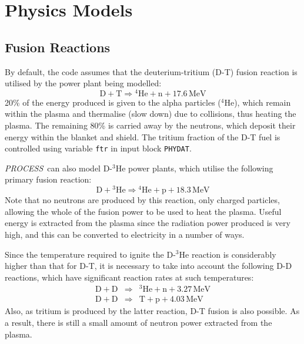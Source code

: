 \documentclass[11pt,a4paper]{report}
\newcommand{\PS}{\mbox{\it PROCESS\/ }}
\begin{document}
\section{Physics Models}

\setlength{\parskip}{0mm}
\subsection{Fusion Reactions}

By default, the code assumes that the deuterium-tritium (D-T) fusion reaction
is utilised by the power plant being modelled:
\begin{equation}
\mathrm{D + T} \Longrightarrow \mathrm{^{4}He + n + 17.6 \,MeV}
\label{eq:d-t}
\end{equation}
20\% of the energy produced is given to the alpha particles ($^4$He), which
remain within the plasma and thermalise (slow down) due to collisions, thus
heating the plasma. The remaining 80\% is carried away by the neutrons, which
deposit their energy within the blanket and shield. The tritium fraction of
the D-T fuel is controlled using variable \texttt{ftr} in input block
\texttt{PHYDAT}.

\setlength{\parskip}{5mm}
\PS can also model D-$^3$He power plants, which utilise the following primary
fusion reaction:
\begin{equation}
\mathrm{D + \mbox{$^3$He}} \Longrightarrow \mathrm{^{4}He + p + 18.3 \,MeV}
\label{eq:dhe3}
\end{equation}
Note that no neutrons are produced by this reaction, only charged particles,
allowing the whole of the fusion power to be used to heat the plasma. Useful
energy is extracted from the plasma since the radiation power produced is very
high, and this can be converted to electricity in a number of ways.

Since the temperature required to ignite the D-$^3$He reaction is considerably
higher than that for D-T, it is necessary to take into account the following
D-D reactions, which have significant reaction rates at such temperatures:
\begin{eqnarray}
\mathrm{D + D} & \Longrightarrow & \mathrm{^{3}He + n + 3.27 \,MeV} \\
\mathrm{D + D} & \Longrightarrow & \mathrm{T + p + 4.03 \,MeV}
\end{eqnarray}
Also, as tritium is produced by the latter reaction, D-T fusion is also
possible. As a result, there is still a small amount of neutron power
extracted from the plasma.
\end{document}
